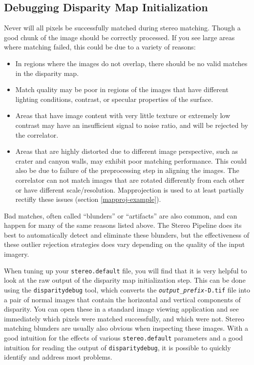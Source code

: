 \subsection{Debugging Disparity Map Initialization}

Never will all pixels be successfully matched during stereo
matching. Though a good chunk of the image should be correctly
processed. If you see large areas where matching failed, this could be
due to a variety of reasons:

\begin{itemize}
\item In regions where the images do not overlap, there should be no
  valid matches in the disparity map.
\item Match quality may be poor in regions of the images that have
  different lighting conditions, contrast, or specular properties of
  the surface.
\item Areas that have image content with very little texture or
  extremely low contrast may have an insufficient signal to noise
  ratio, and will be rejected by the correlator.
\item Areas that are highly distorted due to different image
  perspective, such as crater and canyon walls, may exhibit poor
  matching performance. This could also be due to failure of the
  preprocessing step in aligning the images. The correlator can not
  match images that are rotated differently from each other or have
  different scale/resolution. Mapprojection is used to at least
  partially rectifly these issues (section \ref{mapproj-example}).
\end{itemize}

Bad matches, often called ``blunders'' or ``artifacts'' are also
common, and can happen for many of the same reasons listed above.  The
Stereo Pipeline does its best to automatically detect and eliminate
these blunders, but the effectiveness of these outlier rejection
strategies does vary depending on the quality of the input imagery.

When tuning up your {\tt stereo.default} file, you will find that
it is very helpful to look at the raw output of the disparity map
initialization step.  This can be done using the {\tt disparitydebug}
tool, which converts the \texttt{\textit{output\_prefix}-D.tif}
file into a pair of normal images that contain the horizontal and
vertical components of disparity.  You can open these in a standard
image viewing application and see immediately which pixels were
matched successfully, and which were not. Stereo matching blunders
are usually also obvious when inspecting these images.  With a good
intuition for the effects of various {\tt stereo.default} parameters
and a good intuition for reading the output of {\tt disparitydebug},
it is possible to quickly identify and address most problems.

